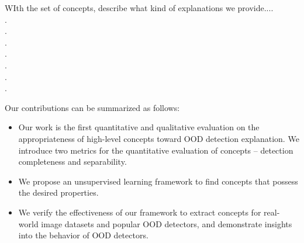 WIth the set of concepts, describe what kind of explanations we provide.... \\.\\.\\.\\.\\.\\.\\.

Our contributions can be summarized as follows:
\begin{itemize}[leftmargin=*, topsep=1pt, noitemsep]
    \item Our work is the first quantitative and qualitative evaluation on the appropriateness of high-level concepts toward OOD detection explanation.
    We introduce two metrics for the quantitative evaluation of concepts -- detection completeness and separability.
    \item We propose an unsupervised  learning framework to find concepts that possess the desired properties.
    \item We verify the effectiveness of our framework to extract concepts for real-world image datasets and popular OOD detectors, and demonstrate insights into the behavior of OOD detectors.
\end{itemize}

\fi